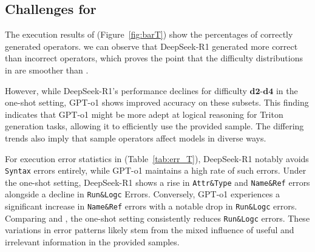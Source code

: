 \subsection{Challenges for \benchtwo}
The execution results of \benchtwo (Figure~\ref{fig:barT}) show the percentages of correctly generated operators.
we can observe that DeepSeek-R1 generated more correct than incorrect operators, which proves the point that the difficulty distributions in \benchtwo are smoother than \benchone. 

However, while DeepSeek-R1's performance declines for difficulty $\mathbf{d2}$-$\mathbf{d4}$ in the one-shot setting, GPT-o1 shows improved accuracy on these subsets. 
This finding indicates that GPT-o1 might be more adept at logical reasoning for Triton generation tasks, allowing it to efficiently use the provided sample. The differing trends also imply that sample operators affect models in diverse ways.





For execution error statistics in \benchtwo (Table~\ref{tab:err_T}), DeepSeek-R1 notably avoids \texttt{Syntax} errors entirely, while GPT-o1 maintains a high rate of such errors. 
Under the one-shot setting, DeepSeek-R1 shows a rise in \texttt{Attr\&Type} and \texttt{Name\&Ref} errors alongside a decline in \texttt{Run\&Logc} Errors. 
Conversely, GPT-o1 experiences a significant increase in \texttt{Name\&Ref} errors with a notable drop in \texttt{Run\&Logc} errors. 
Comparing \benchone and \benchtwo, the one-shot setting consistently reduces \texttt{Run\&Logc} errors. 
These variations in error patterns likely stem from the mixed influence of useful and irrelevant information in the provided samples.



